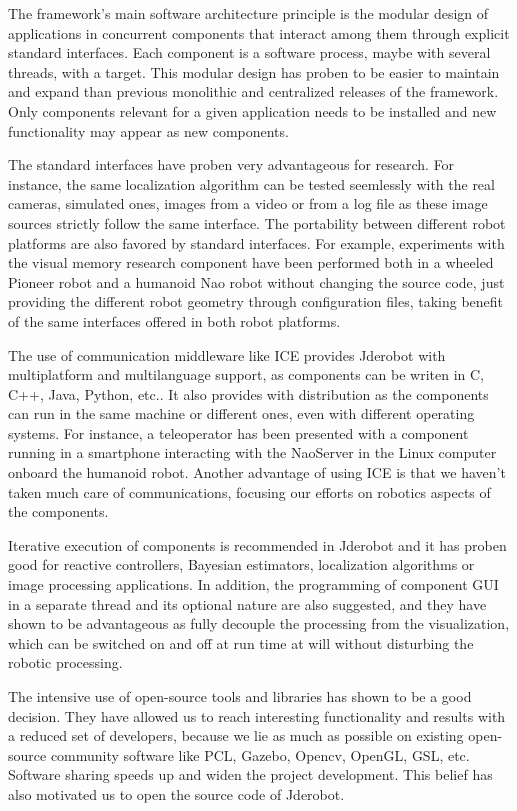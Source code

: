 \documentclass[twocolumn]{svjour3}          %
\begin{document}
The framework's main software architecture principle is the modular design of applications in concurrent components that interact among them through explicit standard interfaces. Each component is a software process, maybe with several threads, with a target. This modular design has proben to be easier to maintain and expand than previous monolithic and centralized releases of the framework. Only components relevant for a given application needs to be installed and new functionality may appear as new components.

The standard interfaces have proben very advantageous for research. For instance, the same localization algorithm can be tested seemlessly with the real cameras, simulated ones, images from a video or from a log file as these image sources strictly follow the same interface. The portability between different robot platforms are also favored by standard interfaces. For example, experiments with the visual memory research component have been performed both in a wheeled Pioneer robot and a humanoid Nao robot without changing the source code, just providing the different robot geometry through configuration files, taking benefit of the same interfaces offered in both robot platforms.

The use of communication middleware like ICE provides Jderobot with multiplatform and multilanguage support, as components can be writen in C, C++, Java, Python, etc.. It also provides with distribution as the components can run in the same machine or different ones, even with different operating systems. For instance, a teleoperator has been presented with a component running in a smartphone interacting with the NaoServer in the Linux computer onboard the humanoid robot. Another advantage of using ICE is that we haven't taken much care of communications, focusing our efforts on robotics aspects of the components.

Iterative execution of components is recommended in Jderobot and it has proben good for reactive controllers, Bayesian estimators, localization algorithms or image processing applications. In addition, the programming of component GUI in a separate thread and its optional nature are also suggested, and they have shown to be advantageous as fully decouple the processing from the visualization, which can be switched on and off at run time at will without disturbing the robotic processing.

The intensive use of open-source tools and libraries has shown to be a good decision. They have allowed us to reach interesting functionality and results with a reduced set of developers, because we lie as much as possible on existing open-source community software like PCL, Gazebo, Opencv, OpenGL, GSL, etc. Software sharing speeds up and widen the project development. This belief has also motivated us to open the source code of Jderobot.
\end{document}
